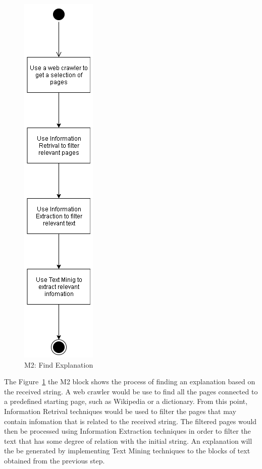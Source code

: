 \begin{figure}[H]
\centering
\includegraphics[scale=0.5]{ch4/assets/M2.png}
\caption[Find Explanation Module]{M2: Find Explanation}
\label{fig:M2}
\end{figure}

The Figure~\ref{fig:M2} the M2 block shows the process of finding an explanation based on the received string.
A web crawler would be use to find all the pages connected to a predefined starting page, such as Wikipedia or a dictionary.
From this point, Information Retrival techniques would be used to filter the pages that may contain infomation that is related to the received string.
The filtered pages would then be processed using Information Extraction techniques in order to filter the text that has some degree of relation with the initial string.
An explanation will the be generated by implementing Text Mining techniques to the blocks of text obtained from the previous step.

